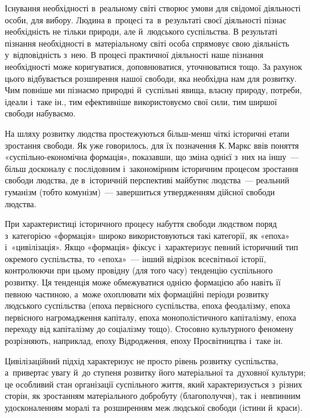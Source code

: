 \documentclass[a5paper,oneside,DIV=12,12pt,headings=small]{scrartcl}
\begin{document}
		Існування необхідності в~реальному світі створює умови для свідомої діяльності особи, для вибору. Людина в~процесі та~в~результаті своєї діяльності пізнає необхідність не тільки природи, але й~людського суспільства. В результаті пізнання необхідності в~матеріальному світі особа спрямовує свою діяльність у~відповідність з~нею. В процесі практичної діяльності наше пізнання необхідності може коригуватися, доповнюватися, уточнюватися тощо. За рахунок цього відбувається розширення нашої свободи, яка необхідна нам для розвитку. Чим повніше ми пізнаємо природні й~суспільні явища, власну природу, потреби, ідеали і~таке ін., тим ефективніше використовуємо свої сили, тим ширшої свободи набуваємо.
		
		На шляху розвитку людства простежуються більш-менш чіткі історичні етапи зростання свободи. Як уже говорилось, для їх позначення К.\,Маркс ввів поняття «суспільно-економічна формація», показавши, що зміна однієї з~них на іншу~— більш досконалу є послідовним і~закономірним історичним процесом зростання свободи людства, де в~історичній перспективі майбутнє людства~— реальний гуманізм (тобто комунізм)~— завершиться утвердженням дійсної свободи людства.
		
		При характеристиці історичного процесу набуття свободи людством поряд з~категорією «формація» широко використовуються такі категорії, як «епоха» і~«цивілізація». Якщо «формація» фіксує і~характеризує певний історичний тип окремого суспільства, то «епоха»~— інший відрізок всесвітньої історії, контролюючи при цьому провідну (для того часу) тенденцію суспільного розвитку. Ця тенденція може обмежуватися однією формацією або навіть її певною частиною, а~може охоплювати міх формаційні періоди розвитку людського суспільства (епоха первісного суспільства, епоха феодалізму, епоха первісного нагромадження капіталу, епоха монополістичного капіталізму, епоха переходу від капіталізму до соціалізму тощо).  Стосовно культурного феномену розрізняють, наприклад, епоху Відродження, епоху Просвітництва і~таке ін.
		
		Цивілізаційний підхід характеризує не просто рівень розвитку суспільства, а~привертає увагу й~до ступеня розвитку його матеріальної та~духовної культури; це особливий стан організації суспільного життя, який характеризується з~різних сторін, як зростанням матеріального добробуту (благополуччя), так і~невпинним удосконаленням моралі та~розширенням меж людської свободи (істини й~краси).

\end{document}
